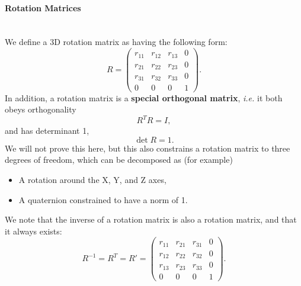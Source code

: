 \documentclass{article}
\begin{document}
\paragraph{Rotation Matrices}\mbox{}\\
We define a 3D rotation matrix as having the following form:
\begin{equation}
R = \begin{pmatrix}
r_{11} & r_{12} & r_{13} & 0\\
r_{21} & r_{22} & r_{23} & 0\\
r_{31} & r_{32} & r_{33} & 0\\
0 & 0 & 0 & 1
\end{pmatrix}.
\end{equation}
In addition, a rotation matrix is a \textbf{special orthogonal matrix}, \textit{i.e.} it both obeys orthogonality
\begin{equation}
R^T R = I,
\end{equation}
and has determinant 1,
\begin{equation}
\det R = 1.
\end{equation}
We will not prove this here, but this also constrains a rotation matrix to three degrees of freedom, which can be decomposed as (for example)
\begin{itemize}
\item A rotation around the X, Y, and Z axes,
\item A quaternion constrained to have a norm of 1.
\end{itemize}
We note that the inverse of a rotation matrix is also a rotation matrix, and that it always exists:
\begin{equation}
R^{-1} = R^T = R' =  \begin{pmatrix}
r_{11} & r_{21} & r_{31} & 0\\
r_{12} & r_{22} & r_{32} & 0\\
r_{13} & r_{23} & r_{33} & 0\\
0 & 0 & 0 & 1
\end{pmatrix}.
\end{equation}
\end{document}
